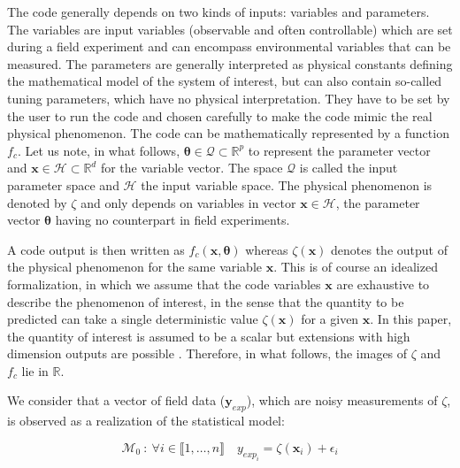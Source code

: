 \documentclass[soumission]{jsfds}
\edef\hc{\string: }
\begin{document}

The code generally depends on two kinds of inputs\hc variables and parameters.
The variables are input variables (observable and often controllable) which are set during a field experiment and can encompass environmental variables that can be measured.
The parameters are generally interpreted as physical constants defining the mathematical model of the system of interest, but can also contain so-called tuning parameters, which have no physical interpretation. They have to be set by the user to run the code and chosen carefully to make the code mimic the real physical phenomenon. 
The code can be mathematically represented by a function $f_c$. Let us note, in what follows, $\boldsymbol{\theta}\in\mathcal{Q}\subset\mathbb{R}^p$ to represent the parameter vector and $\mathbf{x}\in\mathcal{H}\subset \mathbb{R}^d$ for the variable vector. The space $\mathcal{Q}$ is called the input parameter space and $\mathcal{H}$ the input variable space.
The physical phenomenon is denoted by $\zeta$ and only depends on variables in vector $\boldsymbol{x}\in\mathcal{H}$, the parameter vector $\boldsymbol{\theta}$ having no counterpart in field experiments. \newline

A code output is then written as $f_c(\boldsymbol{x},\boldsymbol{\theta})$ whereas $\zeta(\boldsymbol{x})$ denotes the output of the physical phenomenon for the same variable $\boldsymbol{x}$. This is of course an idealized formalization, in which we assume that the code variables $\boldsymbol{x}$ are exhaustive to describe the phenomenon of interest, in the sense that the quantity to be predicted can take a single deterministic value $\zeta(\boldsymbol{x})$ for a given $\boldsymbol{x}$. 
In this paper, the quantity of interest is assumed to be a scalar but 
extensions with high dimension outputs are
possible \citep{higdon2008}. 
Therefore, in what follows, the images of $\zeta$ and $f_c$ lie in $\mathbb{R}$.
\newline

We consider that a vector of field data ($\boldsymbol{y}_{exp}$), which are noisy measurements of $\zeta$, is observed as a realization of the statistical model\hc

\begin{equation*}
\mathcal{M}_0\ : \ \forall i \in \llbracket1,\dots,n\rrbracket \quad y_{exp_i}=\zeta(\boldsymbol{x}_i)+\epsilon_i
\end{equation*}
\end{document}
